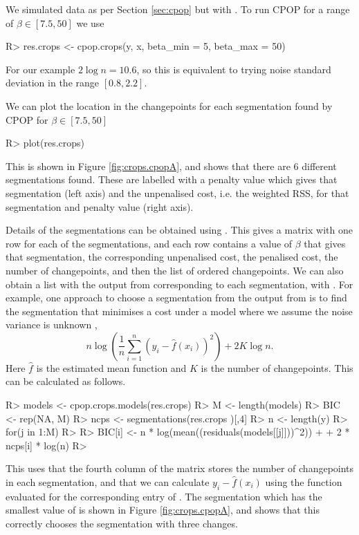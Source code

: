 \documentclass[nojss]{jss}
\begin{document}
We simulated data as per Section \ref{sec:cpop} but with . To run CPOP for a range of $\beta\in[7.5, 50]$ we use
\begin{CodeInput}
R> res.crops <- cpop.crops(y, x, beta_min = 5, beta_max = 50)
\end{CodeInput}
For our example $2 \log n = 10.6$, so this is equivalent to trying noise standard deviation in the range $[0.8,2.2]$. 

We can plot the location in the changepoints for each segmentation found by CPOP for $\beta\in[7.5,50]$
\begin{CodeInput}
R> plot(res.crops)
\end{CodeInput}
This is shown in Figure \ref{fig:crops.cpopA}, and shows that there are 6 different segmentations found. These are labelled with a penalty value which gives that segmentation (left axis) and the unpenalised cost, i.e. the weighted RSS, for that segmentation and penalty value (right axis).

Details of the segmentations can be obtained using . This gives a matrix with one row for each of the segmentations, and each row contains a value of $\beta$ that gives that segmentation, the corresponding unpenalised cost, the penalised cost, the number of changepoints, and then the list of ordered changepoints. 
%
%
We can also obtain a list with the output from  corresponding to each segmentation, with . For example, one approach to choose a segmentation from the output from  is to find the segmentation that minimises a cost under a model where we assume the noise variance is unknown \citep{fryzlewicz2014wild},
\[
 n \log \left( \frac{1}{n} \sum_{i=1}^n \left(y_i-\hat{f}(x_i)\right)^2
\right) + 2 K \log n.
\]
Here $\hat{f}$ is the estimated mean function and $K$ is the number of changepoints. This can be calculated as follows.
\begin{CodeChunk}
\begin{CodeInput}
R> models <- cpop.crops.models(res.crops)
R> M <- length(models)
R> BIC <- rep(NA, M)
R> ncps <- segmentations(res.crops )[,4]
R> n <- length(y)
R> for(j in 1:M)
R> {
R>   BIC[i] <- n * log(mean((residuals(models[[j]]))^2)) 
+    + 2 * ncps[i] * log(n)
R> }
\end{CodeInput}
\end{CodeChunk}
This uses that the fourth column of the matrix  stores the number of changepoints in each segmentation, and that we can calculate $y_i - \hat{f}(x_i)$ using the  function evaluated for the corresponding entry of . The segmentation which has the smallest value of  is shown in Figure \ref{fig:crops.cpopA}, and shows that this correctly chooses the segmentation with three changes.
\end{document}
